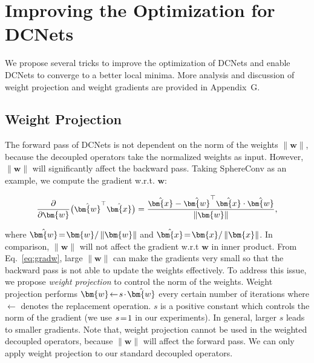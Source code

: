 \section{Improving the Optimization for DCNets}

We propose several tricks to improve the optimization of DCNets and enable DCNets to converge to a better local minima. More analysis and discussion of weight projection and weight gradients are provided in Appendix~\textcolor[rgb]{0.7551,0.2333,0.3333}{G}.

\subsection{Weight Projection}

The forward pass of DCNets is not dependent on the norm of the weights $\|\bm{w}\|$, because the decoupled operators take the normalized weights as input. However, $\|\bm{w}\|$ will significantly affect the backward pass. Taking SphereConv as an example, we compute the gradient w.r.t. $\bm{w}$:

\begin{equation}\label{eq:gradw}
    \small
    \frac{\partial}{\partial \bm{w}}\big( \hat{\bm{w}}^\top\hat{\bm{x}} \big) =
    \frac{\hat{\bm{x}} - \hat{\bm{w}}^\top\hat{\bm{x}}\cdot\hat{\bm{w}}}{\left\lVert\bm{w}\right\rVert},
\end{equation}

\par where $\thickmuskip=2mu \medmuskip=2mu \hat{\bm{w}} = \bm{w}/\left\lVert\bm{w}\right\rVert$ and $\thickmuskip=2mu \medmuskip=2mu \hat{\bm{x}} = \bm{x}/\left\lVert\bm{x}\right\rVert$.
In comparison, $\|\bm{w}\|$ will not affect the gradient w.r.t $\bm{w}$ in inner product. From Eq.~\eqref{eq:gradw}, large $\|\bm{w}\|$ can make the gradients very small so that the backward pass is not able to update the weights effectively. To address this issue, we propose \emph{weight projection} to control the norm of the weights. Weight projection performs $\thickmuskip=2mu \medmuskip=2mu \bm{w}\leftarrow s\cdot \hat{\bm{w}}$ every certain number of iterations where $\leftarrow$ denotes the replacement operation. $s$ is a positive constant which controls the norm of the gradient (we use $\thickmuskip=2mu \medmuskip=2mu s=1$ in our experiments). In general, larger $s$ leads to smaller gradients. Note that, weight projection cannot be used in the weighted decoupled operators, because $\|\bm{w}\|$ will affect the forward pass. We can only apply weight projection to our standard decoupled operators.
